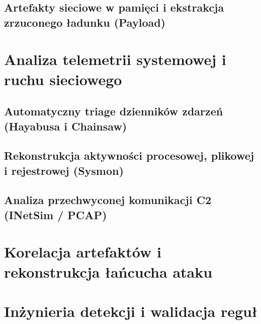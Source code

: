 \subsection{Artefakty sieciowe w pamięci i ekstrakcja zrzuconego ładunku (Payload)}\label{subsec:cs2_ekstrakcja_payload}

\section{Analiza telemetrii systemowej i ruchu sieciowego}\label{sec:cs2_analiza_logow}

\subsection{Automatyczny triage dzienników zdarzeń (Hayabusa i Chainsaw)}\label{subsec:cs2_triage_evtx}

\subsection{Rekonstrukcja aktywności procesowej, plikowej i rejestrowej (Sysmon)}\label{subsec:cs2_sysmon_analiza}

\subsection{Analiza przechwyconej komunikacji C2 (INetSim / PCAP)}\label{subsec:cs2_analiza_sieci}

\section{Korelacja artefaktów i rekonstrukcja łańcucha ataku}\label{sec:cs2_korelacja}

\section{Inżynieria detekcji i walidacja reguł}\label{sec:cs2_inzynieria_detekcji}

